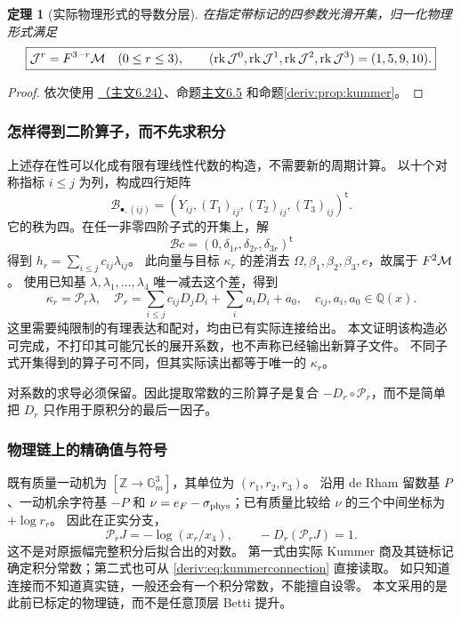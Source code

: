 \documentclass[11pt,a4paper,oneside]{ctexart}
\theoremstyle{cnplain}
\newtheorem{theorem}{定理}[section]
\theoremstyle{definition}
\theoremstyle{remark}
\newcommand{\Q}{\mathbb Q}
\numberwithin{equation}{section}
\newcommand{\otherref}[2]{\href{#1.pdf}{#2}}
\begin{document}
\begin{theorem}[实际物理形式的导数分层]\label{deriv:thm:jets}
在指定带标记的四参数光滑开集，归一化物理形式满足
\begin{equation}\label{deriv:eq:jets}
 \boxed{\mathcal J^r=F^{3-r}\mathcal M\quad(0\le r\le3),
 \qquad (\operatorname{rk}\mathcal J^0,\operatorname{rk}\mathcal J^1,\operatorname{rk}\mathcal J^2,\operatorname{rk}\mathcal J^3)
 =(1,5,9,10).}
\end{equation}
\end{theorem}
\begin{proof}
依次使用 \otherref{feynman_periods_long_paper}{（主文6.24）}、命题\otherref{feynman_periods_long_paper}{主文6.5} 和命题\ref{deriv:prop:kummer}。
\end{proof}

\subsubsection{怎样得到二阶算子，而不先求积分}
上述存在性可以化成有限有理线性代数的构造，不需要新的周期计算。
以十个对称指标 $i\le j$ 为列，构成四行矩阵
\begin{equation}\label{deriv:eq:Bmatrix}
 \mathcal B_{\bullet,(ij)}=
 (Y_{ij},(T_1)_{ij},(T_2)_{ij},(T_3)_{ij})^{\mathsf t}.
\end{equation}
它的秩为四。在任一非零四阶子式的开集上，解
\[
 \mathcal Bc=(0,\delta_{1r},\delta_{2r},\delta_{3r})^{\mathsf t}
\]
得到 $h_r=\sum_{i\le j}c_{ij}\lambda_{ij}$。
此向量与目标 $\kappa_r$ 的差消去 $\Omega,\beta_1,\beta_2,\beta_3,e$，故属于 $F^2\mathcal M$。
使用已知基 $\lambda,\lambda_1,\ldots,\lambda_4$ 唯一减去这个差，得到
\begin{equation}\label{deriv:eq:operator}
 \kappa_r=\mathscr P_r\lambda,
 \quad\mathscr P_r=
 \sum_{i\le j}c_{ij}D_jD_i+\sum_i a_iD_i+a_0,
 \quad c_{ij},a_i,a_0\in\Q(x).
\end{equation}
这里需要纯限制的有理表达和配对，均由已有实际连接给出。
本文证明该构造必可完成，不打印其可能冗长的展开系数，也不声称已经输出新算子文件。
不同子式开集得到的算子可不同，但其实际读出都等于唯一的 $\kappa_r$。

对系数的求导必须保留。因此提取常数的三阶算子是复合
$-D_r\circ\mathscr P_r$，而不是简单把 $D_r$ 只作用于原积分的最后一因子。

\subsubsection{物理链上的精确值与符号}
既有质量一动机为 $[\mathbb Z\to\mathbb G_m^3]$，其单位为 $(r_1,r_2,r_3)$。
沿用 de Rham 留数基 $P$、一动机余字符基 $-P$ 和
$\nu=e_F-\sigma_{\rm phys}$；已有质量比较给
$\nu$ 的三个中间坐标为 $+\log r_r$。
因此在正实分支，
\begin{equation}\label{deriv:eq:physicalextract}
 \boxed{\mathscr P_rJ=-\log(x_r/x_4),\qquad
       -D_r(\mathscr P_rJ)=1.}
\end{equation}
这不是对原振幅完整积分后拟合出的对数。
第一式由实际 Kummer 商及其链标记确定积分常数；第二式也可从 \eqref{deriv:eq:kummerconnection} 直接读取。
如只知道连接而不知道真实链，一般还会有一个积分常数，不能擅自设零。
本文采用的是此前已标定的物理链，而不是任意顶层 Betti 提升。
\end{document}
